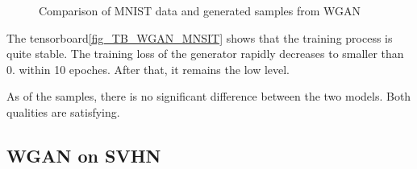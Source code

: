 \documentclass{article}
\begin{document}
\begin{figure}[!htb]
  \centering
  \caption{Comparison of MNIST data and generated samples from WGAN}
\end{figure}

The tensorboard\ref{fig_TB_WGAN_MNSIT} shows that the training process is quite stable. The training loss of the generator rapidly decreases to smaller than $0.$ within 10 epoches. After that, it remains the low level.

As of the samples, there is no significant difference between the two models. Both qualities are satisfying.

\subsection{WGAN on SVHN}
\end{document}
